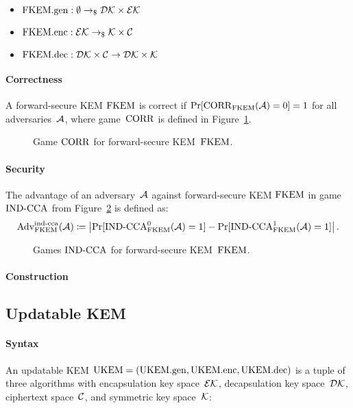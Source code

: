 \documentclass[a4paper,orivec]{llncs}
\begin{document}
\begin{itemize}
    \item $\mathrm{FKEM}.\mathrm{gen}: \emptyset \to_\$ \mathcal{DK}\times\mathcal{EK}$
    \item $\mathrm{FKEM}.\mathrm{enc}: \mathcal{EK} \to_\$ \mathcal{K}\times\mathcal{C}$
    \item $\mathrm{FKEM}.\mathrm{dec}: \mathcal{DK}\times\mathcal{C} \to \mathcal{DK}\times\mathcal{K}$
\end{itemize}

\paragraph{Correctness}
A forward-secure KEM $\mathrm{FKEM}$ is correct if $\Pr[\mathrm{CORR}_{\mathrm{FKEM}}(\mathcal{A})=0]=1$ for all adversaries~$\mathcal{A}$, where game~$\mathrm{CORR}$ is defined in Figure~\ref{fig:fkem:corr}.

\begin{figure}[!ht]
    \centering
    \nicoresetlinenr%
    \fbox{%
        \scalebox{\codescalefactor}{%
        }%
    }
    \caption{%
        Game $\mathrm{CORR}$ for forward-secure KEM~$\mathrm{FKEM}$.
    }
    \label{fig:fkem:corr}
\end{figure}

\paragraph{Security}
The advantage of an adversary~$\mathcal{A}$ against forward-secure KEM $\mathrm{FKEM}$ in game ${\mathrm{IND}\text{-}\mathrm{CCA}}$ from Figure~\ref{fig:fkem:ind} is defined as:
\[
\mathrm{Adv}_{\mathrm{FKEM}}^{\mathrm{ind}\text{-}\mathrm{cca}}(\mathcal{A})\coloneqq\left|\Pr[{\mathrm{IND}\text{-}\mathrm{CCA}}_{\mathrm{FKEM}}^0(\mathcal{A})=1]-\Pr[{\mathrm{IND}\text{-}\mathrm{CCA}}_{\mathrm{FKEM}}^1(\mathcal{A})=1]\right|\text{.}
\]

\begin{figure}[!ht]
    \centering
    \nicoresetlinenr%
    \fbox{%
        \scalebox{\codescalefactor}{%
        }%
    }
    \caption{%
        Games ${\mathrm{IND}\text{-}\mathrm{CCA}}$ for forward-secure KEM~$\mathrm{FKEM}$.
    }
    \label{fig:fkem:ind}
\end{figure}

\paragraph{Construction}


\subsection{Updatable KEM}

\paragraph{Syntax}
An updatable KEM $\mathrm{UKEM}=(\mathrm{UKEM}.\mathrm{gen},\mathrm{UKEM}.\mathrm{enc},\mathrm{UKEM}.\mathrm{dec})$ is a tuple of three algorithms with encapsulation key space~$\mathcal{EK}$, decapsulation key space~$\mathcal{DK}$, ciphertext space~$\mathcal{C}$, and symmetric key space~$\mathcal{K}$:
\end{document}
